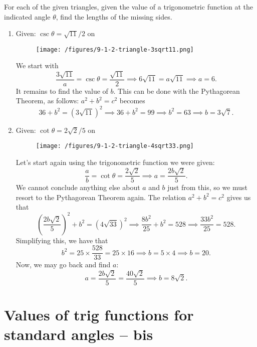 \documentclass{ximera}
\begin{document}
\begin{example}
  For each of the given triangles, given the value of a trigonometric function at the indicated angle $\theta$, find the lengths of the missing sides.
  \begin{enumerate}[label=\alph*.]
  \item Given: $\csc\theta = \sqrt{11}/2$ on
    \begin{figure}[h]
      \centering
      \texttt{[image: /figures/9-1-2-triangle-3sqrt11.png]}
    \end{figure}
    
    \begin{explanation}
      We start with $$\frac{3\sqrt{11}}{a} = \csc\theta = \frac{\sqrt{11}}{2} \implies 6\sqrt{11} = a\sqrt{11} \implies a = 6.$$It remains to find the value of $b$. This can be done with the Pythagorean Theorem, as follows: $a^2+b^2=c^2$ becomes  $$36 + b^2 = (3\sqrt{11})^2 \implies 36+b^2 = 99 \implies b^2= 63 \implies b = 3\sqrt{7}.$$
    \end{explanation}
  \item Given: $\cot\theta = 2\sqrt{2}/5$ on     \begin{figure}[h]
      \centering
      \texttt{[image: /figures/9-1-2-triangle-4sqrt33.png]}
    \end{figure}

    
    \begin{explanation}
      Let's start again using the trigonometric function we were given: $$\frac{a}{b} = \cot\theta = \frac{2\sqrt{2}}{5} \implies a= \frac{2b\sqrt{2}}{5}.$$We cannot conclude anything else about $a$ and $b$ just from this, so we must resort to the Pythagorean Theorem again. The relation $a^2+b^2=c^2$ gives us that $$\left(\frac{2b\sqrt{2}}{5}\right)^2+b^2 = (4\sqrt{33})^2 \implies \frac{8b^2}{25}+b^2 = 528 \implies \frac{33b^2}{25} = 528.$$Simplifying this, we have that $$b^2 = 25\times \frac{528}{33} = 25\times 16 \implies b = 5\times 4 \implies b=20.$$Now, we may go back and find $a$: $$a = \frac{2b\sqrt{2}}{5}= \frac{40\sqrt{2}}{5} \implies b = 8\sqrt{2}.$$
    \end{explanation}
  \end{enumerate}
\end{example}


\section{Values of trig functions for standard angles -- bis}
\end{document}
